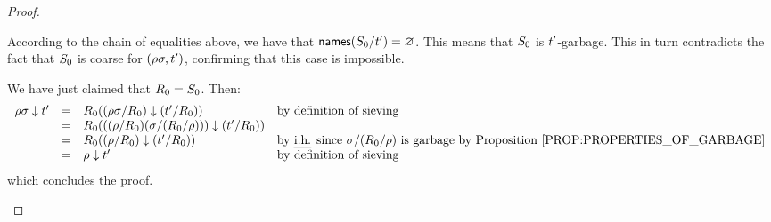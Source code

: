 \begin{proof}
\begin{enumerate}
\begin{enumerate}
    According to the chain of equalities above, we have that $\mathsf{names}(S_0/t') = \varnothing$.
    This means that $S_0$ is $t'$-garbage.
    This in turn contradicts the fact that $S_0$ is coarse for $(\rho\sigma,t')$,
    confirming that this case is impossible.
  \end{enumerate}
  We have just claimed that $R_0 = S_0$.
  Then:
  \[
    \begin{array}{rcll}
    \redseq\redseqtwo \sieve \tm'
    & = & \redex_0((\redseq\redseqtwo/\redex_0) \sieve (\tm'/\redex_0)) & \text{by definition of sieving} \\
    & = & \redex_0(((\redseq/\redex_0)(\redseqtwo/(\redex_0/\redseq))) \sieve (\tm'/\redex_0)) \\
    & = & \redex_0((\redseq/\redex_0) \sieve (\tm'/\redex_0)) & \text{by \ih since $\redseqtwo/(\redex_0/\redseq)$ is garbage by \rprop{properties_of_garbage}} \\
    & = & \redseq \sieve \tm' & \text{by definition of sieving}
    \end{array}
  \]
  which concludes the proof.
\end{enumerate}
\end{proof}


